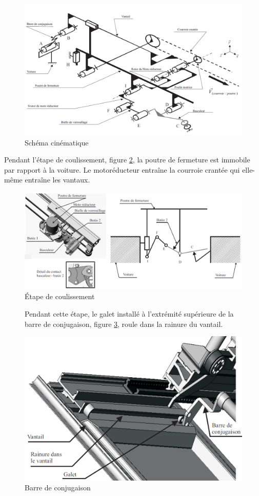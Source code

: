 \begin{figure}[!h]
 \centering\includegraphics[width=0.8\linewidth]{img/Portes5.png}
 \caption{Schéma cinématique}
 \label{fig4}
\end{figure}

\newpage

Pendant l'étape de coulissement, figure \ref{fig5}, la poutre de fermeture est immobile par rapport à la voiture. Le motoréducteur entraîne la courroie crantée qui elle-même entraîne les vantaux.

\begin{figure}[!h]
 \centering\includegraphics[width=0.7\linewidth]{img/Portes6.png}
 \caption{Étape de coulissement}
 \label{fig5}
\end{figure}

\begin{figure}[!h]
\begin{minipage}{0.48\linewidth}
Pendant cette étape, le galet installé à l'extrémité supérieure de la barre de conjugaison, figure \ref{fig6}, roule dans la rainure du vantail.
\end{minipage}
\hfill
\begin{minipage}{0.5\linewidth}
 \centering\includegraphics[width=0.8\linewidth]{img/Portes7.png}
 \caption{Barre de conjugaison}
 \label{fig6}
\end{minipage}
\end{figure}

